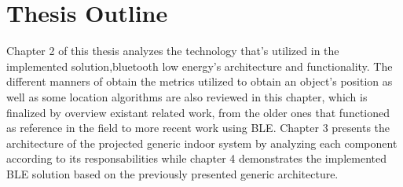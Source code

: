 \section{Thesis Outline}
\label{sec:int_outline}

Chapter 2 of this thesis analyzes the technology that's utilized in the implemented solution,bluetooth low energy's architecture and functionality. The different manners of obtain the metrics utilized to obtain an object's position as well as some location algorithms are also reviewed in this chapter, which is finalized by overview existant related work, from the older ones that functioned as reference in the field to more recent work using \ac{BLE}.
Chapter 3 presents the architecture of the projected generic indoor system by analyzing each component according to its responsabilities while chapter 4 demonstrates the implemented \ac{BLE} solution based on the previously presented generic architecture. 